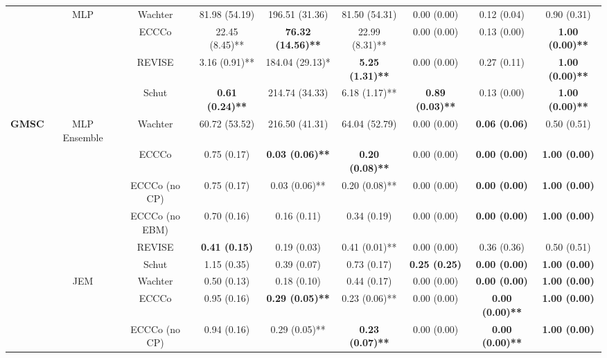 \begin{table}
{\begin{tabular}[t]{>{}c|c|c|c|c|c|c|c|c}
 & \multirow{-4}{*}{\centering\arraybackslash MLP} & Wachter & 81.98 (54.19) & 196.51 (31.36) & 81.50 (54.31) & 0.00 (0.00) & 0.12 (0.04) & 0.90 (0.31)\\
\cline{2-9}
 &  & ECCCo & 22.45 (8.45)** & \textbf{76.32 (14.56)**} & 22.99 (8.31)** & 0.00 (0.00) & 0.13 (0.00) & \textbf{1.00 (0.00)**}\\

 &  & REVISE & 3.16 (0.91)** & 184.04 (29.13)* & \textbf{5.25 (1.31)**} & 0.00 (0.00) & 0.27 (0.11) & \textbf{1.00 (0.00)**}\\

 &  & Schut & \textbf{0.61 (0.24)**} & 214.74 (34.33) & 6.18 (1.17)** & \textbf{0.89 (0.03)**} & 0.13 (0.00) & \textbf{1.00 (0.00)**}\\

\multirow{-16}{*}{\centering\arraybackslash \textbf{GMSC}} & \multirow{-4}{*}{\centering\arraybackslash MLP Ensemble} & Wachter & 60.72 (53.52) & 216.50 (41.31) & 64.04 (52.79) & 0.00 (0.00) & \textbf{0.06 (0.06)} & 0.50 (0.51)\\
\cline{1-9}
 &  & ECCCo & 0.75 (0.17) & \textbf{0.03 (0.06)**} & \textbf{0.20 (0.08)**} & 0.00 (0.00) & \textbf{0.00 (0.00)} & \textbf{1.00 (0.00)}\\

 &  & ECCCo (no CP) & 0.75 (0.17) & 0.03 (0.06)** & 0.20 (0.08)** & 0.00 (0.00) & \textbf{0.00 (0.00)} & \textbf{1.00 (0.00)}\\

 &  & ECCCo (no EBM) & 0.70 (0.16) & 0.16 (0.11) & 0.34 (0.19) & 0.00 (0.00) & \textbf{0.00 (0.00)} & \textbf{1.00 (0.00)}\\

 &  & REVISE & \textbf{0.41 (0.15)} & 0.19 (0.03) & 0.41 (0.01)** & 0.00 (0.00) & 0.36 (0.36) & 0.50 (0.51)\\

 &  & Schut & 1.15 (0.35) & 0.39 (0.07) & 0.73 (0.17) & \textbf{0.25 (0.25)} & \textbf{0.00 (0.00)} & \textbf{1.00 (0.00)}\\

 & \multirow{-6}{*}{\centering\arraybackslash JEM} & Wachter & 0.50 (0.13) & 0.18 (0.10) & 0.44 (0.17) & 0.00 (0.00) & \textbf{0.00 (0.00)} & \textbf{1.00 (0.00)}\\
\cline{2-9}
 &  & ECCCo & 0.95 (0.16) & \textbf{0.29 (0.05)**} & 0.23 (0.06)** & 0.00 (0.00) & \textbf{0.00 (0.00)**} & \textbf{1.00 (0.00)}\\

 &  & ECCCo (no CP) & 0.94 (0.16) & 0.29 (0.05)** & \textbf{0.23 (0.07)**} & 0.00 (0.00) & \textbf{0.00 (0.00)**} & \textbf{1.00 (0.00)}\\


\end{tabular}}
\end{table}
